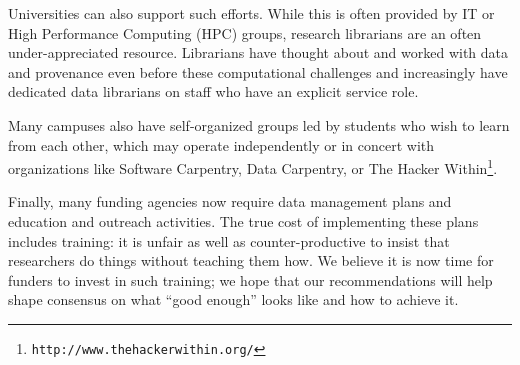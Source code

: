 \documentclass[10pt,letterpaper]{article}
\newcommand{\withurl}[2]{{#1}\footnote{{\texttt{#2}}}}
\begin{document}
Universities can also support such efforts. While this is often
provided by IT or High Performance Computing (HPC) groups, research
librarians are an often under-appreciated resource.  Librarians have
thought about and worked with data and provenance even before these
computational challenges and increasingly have dedicated data
librarians on staff who have an explicit service role.

Many campuses also have self-organized groups led by students who wish
to learn from each other, which may operate independently or in
concert with organizations like Software Carpentry, Data Carpentry, or
\withurl{The Hacker Within}{http://www.thehackerwithin.org/}.

Finally, many funding agencies now require data management plans and
education and outreach activities. The true cost of implementing these
plans includes training: it is unfair as well as counter-productive to
insist that researchers do things without teaching them how. We
believe it is now time for funders to invest in such training; we hope
that our recommendations will help shape consensus on what ``good
enough'' looks like and how to achieve it.
\end{document}
